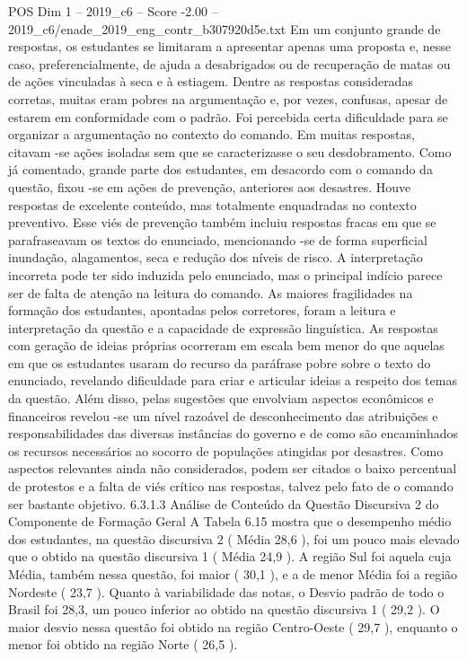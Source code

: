 \begin{textsample}{POS Dim 1 – 2019\_c6 – Score -2.00 – 2019\_c6/enade\_2019\_eng\_contr\_b307920d5e.txt}
Em um conjunto grande de respostas, os estudantes se limitaram a apresentar apenas uma proposta e, nesse caso, preferencialmente, de ajuda a desabrigados ou de recuperação de matas ou de ações vinculadas à seca e à estiagem.
Dentre as respostas consideradas corretas, muitas eram pobres na argumentação e, por vezes, confusas, apesar de estarem em conformidade com o padrão.
Foi percebida certa dificuldade para se organizar a argumentação no contexto do comando.
Em muitas respostas, citavam -se ações isoladas sem que se caracterizasse o seu desdobramento.
Como já comentado, grande parte dos estudantes, em desacordo com o comando da questão, fixou -se em ações de prevenção, anteriores aos desastres.
Houve respostas de excelente conteúdo, mas totalmente enquadradas no contexto preventivo.
Esse viés de prevenção também incluiu respostas fracas em que se parafraseavam os textos do enunciado, mencionando -se de forma superficial inundação, alagamentos, seca e redução dos níveis de risco.
A interpretação incorreta pode ter sido induzida pelo enunciado, mas o principal indício parece ser de falta de atenção na leitura do comando.
As maiores fragilidades na formação dos estudantes, apontadas pelos corretores, foram a leitura e interpretação da questão e a capacidade de expressão linguística.
As respostas com geração de ideias próprias ocorreram em escala bem menor do que aquelas em que os estudantes usaram do recurso da paráfrase pobre sobre o texto do enunciado, revelando dificuldade para criar e articular ideias a respeito dos temas da questão.
Além disso, pelas sugestões que envolviam aspectos econômicos e financeiros revelou -se um nível razoável de desconhecimento das atribuições e responsabilidades das diversas instâncias do governo e de como são encaminhados os recursos necessários ao socorro de populações atingidas por desastres.
Como aspectos relevantes ainda não considerados, podem ser citados o baixo percentual de protestos e a falta de viés crítico nas respostas, talvez pelo fato de o comando ser bastante objetivo. 6.3.1.3 Análise de Conteúdo da Questão Discursiva 2 do Componente de Formação Geral A Tabela 6.15 mostra que o desempenho médio dos estudantes, na questão discursiva 2 ( Média 28,6 ), foi um pouco mais elevado que o obtido na questão discursiva 1 ( Média 24,9 ).
A região Sul foi aquela cuja Média, também nessa questão, foi maior ( 30,1 ), e a de menor Média foi a região Nordeste ( 23,7 ).
Quanto à variabilidade das notas, o Desvio padrão de todo o Brasil foi 28,3, um pouco inferior ao obtido na questão discursiva 1 ( 29,2 ).
O maior desvio nessa questão foi obtido na região Centro-Oeste ( 29,7 ), enquanto o menor foi obtido na região Norte ( 26,5 ).

\end{textsample}
